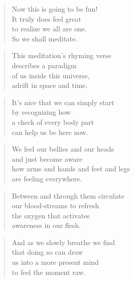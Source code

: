 \documentclass[14pt,a4paper]{article}
\begin{document}
\twocolumn
%    


\begin{verse}
Now this is going to be fun!\\
It truly does feel great\\
to realize we all are one.\\
So we shall meditate.
\end{verse}

\begin{verse}
This meditation’s rhyming verse\\
describes a paradigm\\
of us inside this universe,\\
adrift in space and time.
\end{verse}

\begin{verse}
It’s nice that we can simply start\\
by recognizing how\\
a check of every body part\\
can help us be here now.
\end{verse}

\begin{verse}
We feel our bellies and our heads\\
and just become aware\\
how arms and hands and feet and legs\\
are feeling everywhere.
\end{verse}

\begin{verse}
Between and through them circulate\\
our blood-streams to refresh\\
the oxygen that activates\\
awareness in our flesh.
\end{verse}

\begin{verse}
And as we slowly breathe we find\\
that doing so can draw\\
us into a more present mind\\
to feel the moment raw.
\end{verse}
\end{document}
